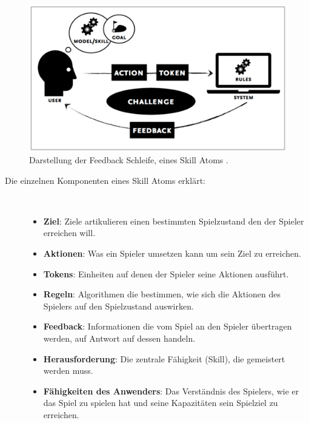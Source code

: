 \documentclass[a4paper,12pt]{scrartcl}
\begin{document}
\\
\begin{figure}[h!]
\begin{center}
\includegraphics[scale = 0.6]{Bilder/SkillAtoms.eps}
\caption{Darstellung der Feedback Schleife, eines Skill Atoms \cite{Deterding2013}.}
\label{SkillAtomBild}
\end{center}
\end{figure}
\begin{description}
   \item[Die einzelnen Komponenten eines Skill Atoms erklärt:]~\par
   \begin{itemize}
      \item \textbf{Ziel}: Ziele artikulieren einen bestimmten Spielzustand den der Spieler erreichen will. 
      \item \textbf{Aktionen}: Was ein Spieler umsetzen kann um sein Ziel zu erreichen.
      \item \textbf{Tokens}: Einheiten auf denen der Spieler seine Aktionen ausführt.
      \item \textbf{Regeln}: Algorithmen die bestimmen, wie sich die Aktionen des Spielers auf den Spielzustand auswirken.
      \item \textbf{Feedback}: Informationen die vom Spiel an den Spieler übertragen werden, auf Antwort auf dessen handeln.	  
      \item \textbf{Herausforderung}: Die zentrale Fähigkeit (Skill), die gemeistert werden muss.
      \item \textbf{Fähigkeiten des Anwenders}: Das Verständnis des Spielers, wie er das Spiel zu spielen hat und seine Kapazitäten sein Spielziel zu erreichen.
   \end{itemize}
\end{description}
\end{document}
